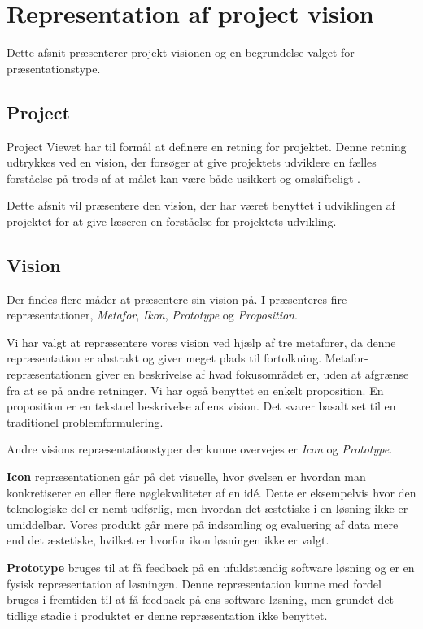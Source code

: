 \section{Representation af project vision}\label{projectvisionrepr}
Dette afsnit præsenterer projekt visionen og en begrundelse valget for præsentationstype.
\subsection{Project}
Project Viewet har til formål at definere en retning for projektet.
Denne retning udtrykkes ved en vision, der forsøger at give projektets udviklere en fælles forståelse på trods af at målet kan være både usikkert og omskifteligt \cite[Kapitel 15 - Project]{art:essence}.

Dette afsnit vil præsentere den vision, der har været benyttet i udviklingen af projektet for at give læseren en forståelse for projektets udvikling.

\subsection{Vision}\label{vision}
Der findes flere måder at præsentere sin vision på. 
I \citet[Kapitel 24 - Representation]{art:essence} præsenteres fire repræsentationer, \textit{Metafor}, \textit{Ikon}, \textit{Prototype} og \textit{Proposition}.

Vi har valgt at repræsentere vores vision ved hjælp af tre metaforer, da denne repræsentation er abstrakt og giver meget plads til fortolkning.
Metafor-repræsentationen giver en beskrivelse af hvad fokusområdet er, uden at afgrænse fra at se på andre retninger.
Vi har også benyttet en enkelt proposition.
En proposition er en tekstuel beskrivelse af ens vision. Det svarer basalt set til en traditionel problemformulering.

Andre visions repræsentationstyper der kunne overvejes er \textit{Icon} og \textit{Prototype}.

\textbf{Icon} repræsentationen går på det visuelle, hvor øvelsen er hvordan man konkretiserer en eller flere nøglekvaliteter af en idé.
Dette er eksempelvis hvor den teknologiske del er nemt udførlig, men hvordan det æstetiske i en løsning ikke er umiddelbar.
Vores produkt går mere på indsamling og evaluering af data mere end det æstetiske, hvilket er hvorfor ikon løsningen ikke er valgt.

\textbf{Prototype} bruges til at få feedback på en ufuldstændig software løsning og er en fysisk repræsentation af løsningen.
Denne repræsentation kunne med fordel bruges i fremtiden til at få feedback på ens software løsning, men grundet det tidlige stadie i produktet er denne repræsentation ikke benyttet.

